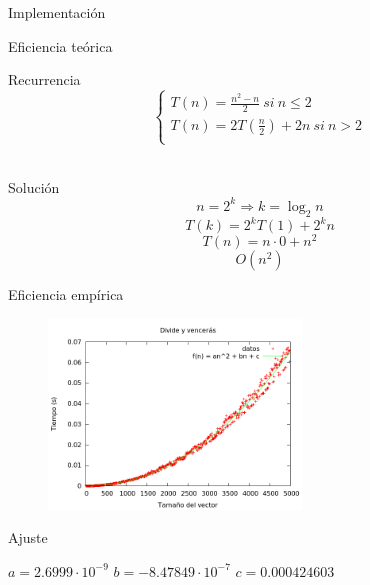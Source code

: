 \begin{frame}{Implementación}

\end{frame}

\begin{frame}{Eficiencia teórica}
\begin{block}{Recurrencia}
$$\left\lbrace
	\begin{array}{l}
	T(n) = \frac{n^2 - n}{2}\  si\ n \leq 2\\
	T(n) = 2T(\frac{n}{2}) + 2n\  si\ n > 2 \\
	\end{array}
	\right.$$\\
\end{block}

\begin{block}{Solución}
$$n=2^k \Rightarrow k = \log_2n$$
$$T(k) = 2^kT(1) + 2^kn$$
$$T(n) = n \cdot 0 + n^2$$
$$O(n^2)$$
\end{block}
\end{frame}

\begin{frame}{Eficiencia empírica}
\begin{figure}[h]
	\centering
		\includegraphics[width=0.6\textwidth]{../Opcional/Graficas/dyv_bruno.png}
\end{figure}

\begin{block}{Ajuste}
\begin{center}
$a = 2.6999 \cdot 10^{-9}$
$b = -8.47849 \cdot 10^{-7}$
$c = 0.000424603$
\end{center}
\end{block}
\end{frame}



